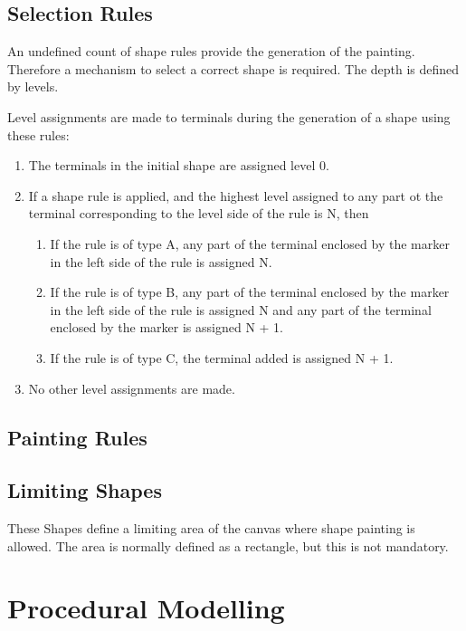 \documentclass[11pt, a4paper]{report}
\begin{document}
\subsection{Selection Rules}
An undefined count of shape rules provide the generation of the painting. Therefore a mechanism to select a correct shape is required. The depth is defined by levels.
\begin{displayquote}
    Level assignments are made to terminals during the generation of a shape using these rules:
    \begin{enumerate}
        \item The terminals in the initial shape are assigned level 0.
        \item If a shape rule is applied, and the highest level assigned to any part ot the terminal corresponding to the level side of the rule is N, then
        \begin{enumerate}
            \item If the rule is of type A, any part of the terminal enclosed by the marker in the left side of the rule is assigned N.
            \item If the rule is of type B, any part of the terminal enclosed by the marker in the left side of the rule is assigned N and any part of the terminal enclosed by the marker is assigned N + 1.
            \item If the rule is of type C, the terminal added is assigned N + 1.
        \end{enumerate}
        \item No other level assignments are made.
    \end{enumerate}
\end{displayquote}
\subsection{Painting Rules}

\subsection{Limiting Shapes}
These Shapes define a limiting area of the canvas where shape painting is allowed. The area is normally defined as a rectangle, but this is not mandatory.

\section{Procedural Modelling}
\end{document}
